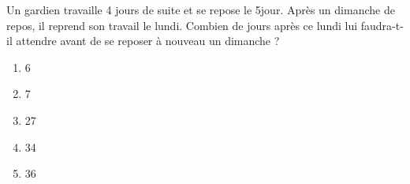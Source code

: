 Un gardien travaille 4 jours de suite et se repose le 5\ieme jour. Après un dimanche de repos, il reprend son travail le lundi. Combien de jours après ce lundi lui faudra-t-il attendre avant de se reposer à nouveau un dimanche ?
\begin{multicols}{5}
  \begin{enumerate}[A/]
    \item 6
    \item 7
    \item 27
    \item 34
    \item 36
  \end{enumerate}
\end{multicols}
